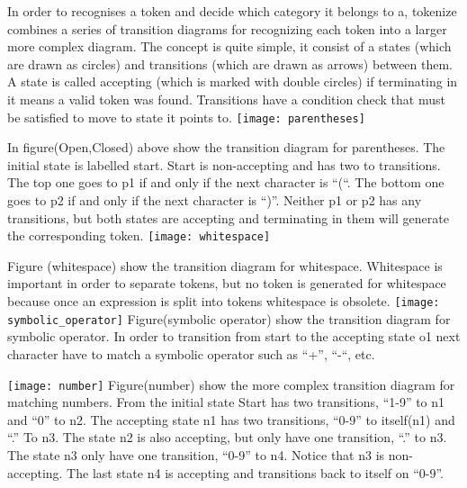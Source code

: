 \documentclass[12pt,a4paper]{article}
\begin{document}
\textnormal{
  \newline
  In order to recognises a token and decide which category it belongs to a, tokenize combines a series of transition diagrams for recognizing each token into a larger more complex diagram. The concept is quite simple, it consist of a states (which are drawn as circles) and transitions (which are drawn as arrows) between them. A state is called accepting (which is marked with double circles) if terminating in it means a valid token was found. Transitions have a condition check that must be satisfied to move to state it points to.
}
\texttt{[image: parentheses]}

\textnormal{
  \newline
  In figure(Open,Closed) above show the transition diagram for parentheses. The initial state is labelled start. Start is non-accepting and has two to transitions. The top one goes to p1 if and only if the next character is “(“.  The bottom one goes to p2 if and only if the next character is “)”. Neither p1 or p2 has any transitions, but both states are accepting and terminating in them will generate the corresponding token.
  \newline
}
\texttt{[image: whitespace]}

\textnormal{
  \newline
  Figure (whitespace) show the transition diagram for whitespace. Whitespace is important in order to separate tokens, but no token is generated for whitespace because once an expression is split into tokens whitespace is obsolete.
  \newline
}
\texttt{[image: symbolic\_operator]}
\textnormal{
  Figure(symbolic operator) show the transition diagram for symbolic operator. In order to transition from start to the accepting state o1 next character have to match a symbolic operator such as “+”, “-“, etc. 
  \newline
}

\texttt{[image: number]}
\textnormal{
  \newline
  Figure(number) show the more complex transition diagram for matching numbers. From the initial state Start has two transitions, “1-9” to n1 and “0” to n2. The accepting state n1 has two transitions, “0-9” to itself(n1) and “.” To n3. The state n2 is also accepting, but only have one transition, “.” to n3. The state n3 only have one transition, “0-9” to n4. Notice that n3 is non-accepting. The last state n4 is accepting and transitions back to itself on “0-9”.
  \newline
}
\end{document}
